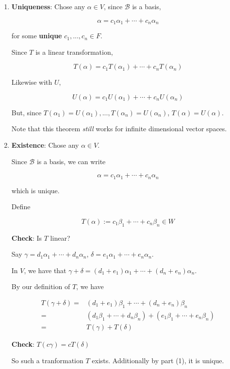 \documentclass[12pt]{article}
\def\B{\mathcal B}
\begin{document}
  {
    \begin{enumerate}
      \item {\bf Uniqueness}: Chose any $\alpha \in V$, since $\B$ is a basis,


      \[
        \alpha = c_1 \alpha_1 + \cdots + c_n \alpha_n
      \]
      
      for some {\bf unique} $c_1, ..., c_n \in F$.

      Since $T$ is a linear transformation,

      \[
        T(\alpha) = c_1 T(\alpha_1) + \cdots + c_n T(\alpha_n)
      \]

      Likewise with $U$,

      \[
        U(\alpha) = c_1 U(\alpha_1) + \cdots + c_n U(\alpha_n)
      \]

      But, since $T(\alpha_1) = U(\alpha_1), ..., T(\alpha_n) = U(\alpha_n)$,
      $T(\alpha) = U(\alpha)$.


      Note that this theorem {\it still} works for infinite dimensional
      vector spaces.

    \item {\bf Existence}: Chose any $\alpha \in V$. 

      Since $\B$ is a basis, we can write

      \[
        \alpha = c_1 \alpha_1 + \cdots + c_n \alpha_n
      \]

      which is unique.

      Define 

      \[
        T(\alpha) := c_1 \beta_1 + \cdots + c_n \beta_n \in W
      \]

      {\bf Check}: Is $T$ linear?

      Say $\gamma = d_1 \alpha_1 + \cdots + d_n \alpha_n$, $\delta = e_1
      \alpha_1 + \cdots + e_n \alpha_n$.

      In $V$, we have that $\gamma + \delta = (d_1 + e_1) \alpha_1 + \cdots +
      (d_n + e_n) \alpha_n$.

      By our definition of $T$, we have

      \begin{align*}
        T(\gamma + \delta) =&(d_1 + e_1) \beta_1 + \cdots + (d_n + e_n) \beta_n \\
        =&(d_1 \beta_1 + \cdots + d_n \beta_n) + (e_1 \beta_1 +
        \cdots + e_n \beta_n) \\
        =&T(\gamma) + T(\delta)
      \end{align*}

      {\bf Check}: $T(c\gamma) = cT(\delta)$

      So such a tranformation $T$ exists. Additionally by part (1), it is
      unique.

    \end{enumerate}
  }
\end{document}
